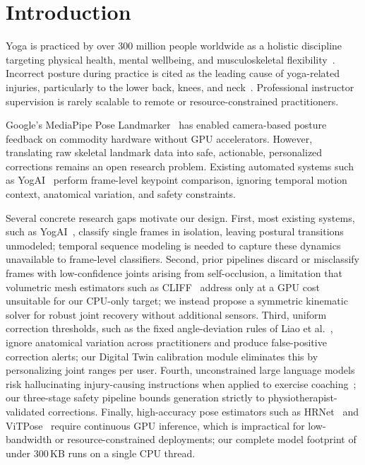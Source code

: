 \documentclass[conference]{IEEEtran}
\begin{document}
\section{Introduction}
\label{sec:intro}

Yoga is practiced by over 300 million people worldwide as a holistic discipline targeting
physical health, mental wellbeing, and musculoskeletal flexibility~\cite{yoga_global_2024}.
Incorrect posture during practice is cited as the leading cause of yoga-related injuries,
particularly to the lower back, knees, and neck~\cite{injury_yoga_2022}. Professional
instructor supervision is rarely scalable to remote or resource-constrained practitioners.

Google's MediaPipe Pose Landmarker~\cite{mediapipe_2020} has enabled camera-based posture
feedback on commodity hardware without GPU accelerators. However, translating raw skeletal
landmark data into safe, actionable, personalized corrections remains an open research
problem. Existing automated systems such as YogAI~\cite{yogai2021} perform frame-level
keypoint comparison, ignoring temporal motion context, anatomical variation, and safety
constraints.

Several concrete research gaps motivate our design. First, most existing systems, such as
YogAI~\cite{yogai2021}, classify single frames in isolation,
leaving postural transitions unmodeled; temporal sequence modeling is needed to capture
these dynamics unavailable to frame-level classifiers. Second, prior pipelines discard or
misclassify frames with low-confidence joints arising from self-occlusion, a limitation
that volumetric mesh estimators such as CLIFF~\cite{cliff2022} address only at a GPU cost
unsuitable for our CPU-only target; we instead propose a symmetric kinematic solver for
robust joint recovery without additional sensors. Third, uniform correction thresholds,
such as the fixed angle-deviation rules of Liao et al.~\cite{action_correction_2020},
ignore anatomical variation across practitioners and produce false-positive correction
alerts; our Digital Twin calibration module eliminates this by personalizing joint ranges
per user. Fourth, unconstrained large language models risk hallucinating injury-causing
instructions when applied to exercise coaching~\cite{llm_fitness_2024}; our three-stage
safety pipeline bounds generation strictly to physiotherapist-validated corrections.
Finally, high-accuracy pose estimators such as HRNet~\cite{hrnet2019} and
ViTPose~\cite{vitpose2022} require continuous GPU inference, which is impractical for
low-bandwidth or resource-constrained deployments; our complete model footprint of under
300\,KB runs on a single CPU thread.
\end{document}
